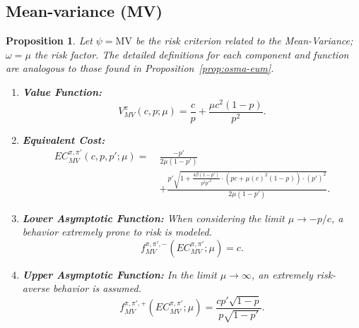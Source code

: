 \documentclass[runningheads]{llncs}
\newtheorem{proposition}{Proposition}
\begin{document}

\subsection{Mean-variance (MV)}

\begin{proposition}\label{prop:osma-mv}
    Let $\psi = \text{MV}$ be the risk criterion related to the Mean-Variance; $\omega = \mu$ the risk factor. The detailed definitions for each component and function are analogous to those found in Proposition~\ref{prop:osma-eum}.
    \begin{enumerate}
        \item \textbf{Value Function:}
        \begin{equation}
            V^{\pi}_{MV}(c, p; \mu) = \frac{c}{p} + \frac{\mu c^2 (1 - p)}{p^2}.
        \end{equation}
        
        \item \textbf{Equivalent Cost:}
        \begin{equation}
            \begin{aligned}
                EC^{\pi, \pi'}_{MV}(c, p, p'; \mu) =\ 
                & \frac{-p'}{2 \mu (1 - p')} \nonumber \\
                & + \frac{p' \sqrt{1 + \frac{4 \beta (1 - p')}{p^2 p'^2} \cdot \left(p c + \mu (c)^2 (1 - p)\right) \cdot (p')^2}}{2 \mu (1 - p')}.
            \end{aligned}
        \end{equation}
        
        \item \textbf{Lower Asymptotic Function:} When considering the limit $\mu \to -p/c$, a behavior extremely prone to risk is modeled.
        \begin{equation}
            f^{\pi, \pi', -}_{MV}(EC^{\pi, \pi'}_{MV}; \mu) = c.
        \end{equation}
        
        \item \textbf{Upper Asymptotic Function:} In the limit $\mu \to \infty$, an extremely risk-averse behavior is assumed.
        \begin{equation}
            f^{\pi, \pi', +}_{MV}(EC^{\pi, \pi'}_{MV}; \mu) = 
            \frac{c p' \sqrt{1 - p}}{p \sqrt{1 - p'}}.
        \end{equation}
    \end{enumerate}
\end{proposition} 
\end{document}
